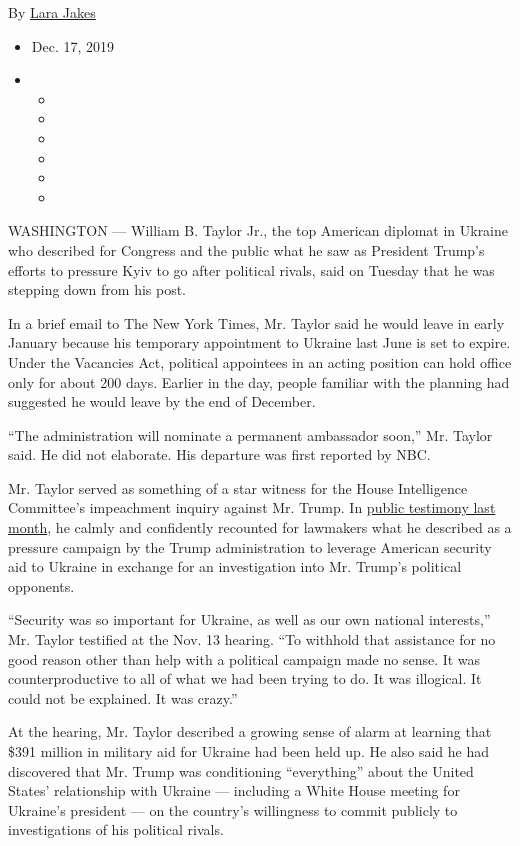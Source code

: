 By \href{https://www.nytimes.com/by/lara-jakes}{Lara Jakes}

\begin{itemize}
\item
  Dec. 17, 2019
\item
  \begin{itemize}
  \item
  \item
  \item
  \item
  \item
  \item
  \end{itemize}
\end{itemize}

WASHINGTON --- William B. Taylor Jr., the top American diplomat in
Ukraine who described for Congress and the public what he saw as
President Trump's efforts to pressure Kyiv to go after political rivals,
said on Tuesday that he was stepping down from his post.

In a brief email to The New York Times, Mr. Taylor said he would leave
in early January because his temporary appointment to Ukraine last June
is set to expire. Under the Vacancies Act, political appointees in an
acting position can hold office only for about 200 days. Earlier in the
day, people familiar with the planning had suggested he would leave by
the end of December.

``The administration will nominate a permanent ambassador soon,'' Mr.
Taylor said. He did not elaborate. His departure was first reported by
NBC.

Mr. Taylor served as something of a star witness for the House
Intelligence Committee's impeachment inquiry against Mr. Trump. In
\href{https://www.nytimes.com/2019/11/13/us/politics/bill-taylor-impeachment-hearing.html}{public
testimony last month}, he calmly and confidently recounted for lawmakers
what he described as a pressure campaign by the Trump administration to
leverage American security aid to Ukraine in exchange for an
investigation into Mr. Trump's political opponents.

``Security was so important for Ukraine, as well as our own national
interests,'' Mr. Taylor testified at the Nov. 13 hearing. ``To withhold
that assistance for no good reason other than help with a political
campaign made no sense. It was counterproductive to all of what we had
been trying to do. It was illogical. It could not be explained. It was
crazy.''

At the hearing, Mr. Taylor described a growing sense of alarm at
learning that \$391 million in military aid for Ukraine had been held
up. He also said he had discovered that Mr. Trump was conditioning
``everything'' about the United States' relationship with Ukraine ---
including a White House meeting for Ukraine's president --- on the
country's willingness to commit publicly to investigations of his
political rivals.

